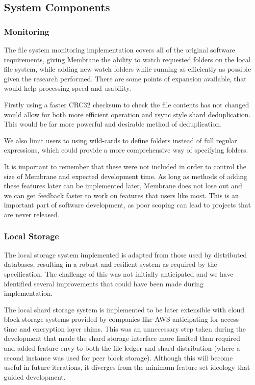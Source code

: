 \documentclass[11pt, a4paper, twocolumn, twoside]{report}
\begin{document}
\subsection{System Components}

\subsubsection{Monitoring}

The file system monitoring implementation covers all of the original software requirements, giving Membrane the ability to watch requested folders on the local file system, while adding new watch folders while running as efficiently as possible given the research performed. There are some points of expansion available, that would help processing speed and usability.

Firstly using a faster CRC32 checksum to check the file contents has not changed would allow for both more efficient operation and rsync style shard deduplication. This would be far more powerful and desirable method of deduplication.

We also limit users to using wild-cards to define folders instead of full regular expressions, which could provide a more comprehensive way of specifying folders.

It is important to remember that these were not included in order to control the size of Membrane and expected development time. As long as methods of adding these features later can be implemented later, Membrane does not lose out and we can get feedback faster to work on features that users like most. This is an important part of software development, as poor scoping can lead to projects that are never released.

\subsubsection{Local Storage}

The local storage system implemented is adapted from those used by distributed databases, resulting in a robust and resilient system as required by the specification. The challenge of this was not initially anticipated and we have identified several improvements that could have been made during implementation.

The local shard storage system is implemented to be later extensible with cloud block storage systems provided by companies like AWS anticipating for access time and encryption layer shims. This was an unnecessary step taken during the development that made the shard storage interface more limited than required and added feature envy to both the file ledger and shard distribution (where a second instance was used for peer block storage). Although this will become useful in future iterations, it diverges from the minimum feature set ideology that guided development.
\end{document}
